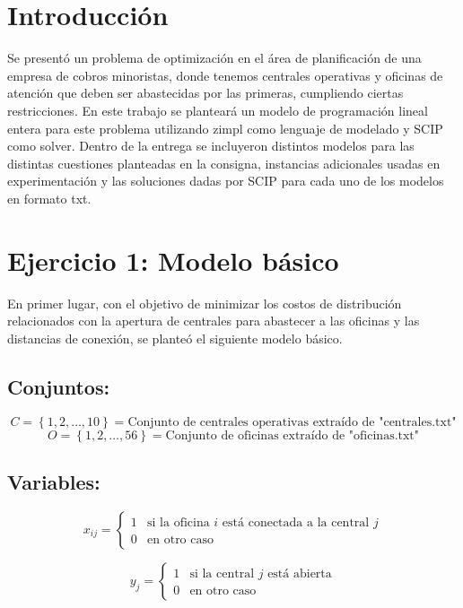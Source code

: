 \documentclass{article}
\begin{document}
\section*{Introducción}

Se presentó un problema de optimización en el área de planificación de una empresa de cobros minoristas, donde tenemos centrales operativas y oficinas de atención que deben ser abastecidas por las primeras, cumpliendo ciertas restricciones. En este trabajo se planteará un modelo de programación lineal entera para este problema utilizando zimpl como lenguaje de modelado y SCIP como solver. Dentro de la entrega se incluyeron distintos modelos para las distintas cuestiones planteadas en la consigna, instancias adicionales usadas en experimentación y las soluciones dadas por SCIP para cada uno de los modelos en formato txt.

\section*{Ejercicio 1: Modelo básico}

En primer lugar, con el objetivo de minimizar los costos de distribución relacionados con la apertura de centrales para abastecer a las oficinas y las distancias de conexión, se planteó el siguiente modelo básico.

\subsection*{Conjuntos:}
\[
C = \left\{ 1, 2, \ldots, 10 \right\} = \text{Conjunto de centrales operativas extraído de "centrales.txt"}
\]
\[
O = \left\{ 1, 2, \ldots, 56 \right\} = \text{Conjunto de oficinas extraído de "oficinas.txt"}
\]

\vspace{0.5cm}

\subsection*{Variables:}
\[
x_{ij} = 
\begin{cases} 
1 & \text{si la oficina } i \text{ está conectada a la central } j \\ 
0 & \text{en otro caso}
\end{cases}
\]

\vspace{0.5cm}

\[
y_j = 
\begin{cases} 
1 & \text{si la central } j \text{ está abierta} \\ 
0 & \text{en otro caso}
\end{cases}
\]
\end{document}

